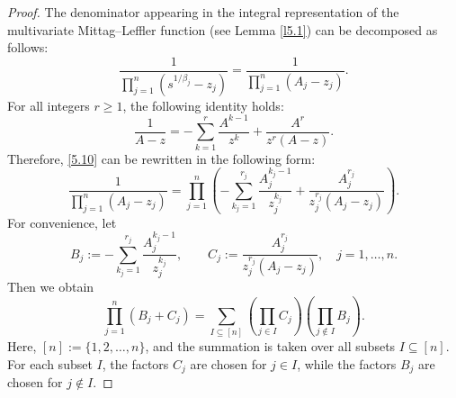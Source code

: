 \documentclass[12pt, reqno]{amsart}
\theoremstyle{definition}
\theoremstyle{remark}
\numberwithin{equation}{section}
\begin{document}
\begin{proof}
The denominator appearing in the integral representation of the multivariate Mittag--Leffler function (see Lemma \ref{l5.1}) can be decomposed as follows:
\begin{equation}\label{5.10}
\frac{
1}
{
\prod\limits_{j=1}^n(s^{1/\beta_j}-z_j)
}=\frac{
1}
{
\prod\limits_{j=1}^n(A_j-z_j)
}.
\end{equation}
For all integers $r\geq 1$, the following identity holds:
\begin{equation}\label{5.11}
\frac{1}{A-z}=-\sum_{k=1}^r\frac{A^{k-1}}{z^k}+\frac{A^r}{z^r(A-z)}.
\end{equation}
Therefore, \eqref{5.10} can be rewritten in the following form:
\begin{equation}\label{5.12}
\frac{
1}
{
\prod\limits_{j=1}^n(A_j-z_j)
}=\prod_{j=1}^n\left(-\sum_{k_j=1}^{r_j}\frac{A_j^{k_j-1}}{z_j^{k_j}}+\frac{A_j^{r_j}}{z_j^{r_j}(A_j-z_j)}\right).
\end{equation}
For convenience, let
\[
B_j:=
-\sum_{k_j=1}^{r_j}
\frac{A_j^{k_j-1}}{z_j^{k_j}},
\qquad
C_j:=
\frac{A_j^{r_j}}
{z_j^{r_j}(A_j-z_j)},
\quad j=1,\ldots,n.
\]
Then we obtain
\begin{equation}\label{5.13}
\prod_{j=1}^{n}(B_j+C_j)
=
\sum_{I\subseteq[n]}
\left(
\prod_{j\in I}C_j
\right)
\left(
\prod_{j\notin I}B_j
\right).
\end{equation}
Here, $[n]:=\{1,2,\ldots,n\}$, and the summation is taken over all subsets
$I\subseteq[n]$. For each subset $I$, the factors $C_j$ are chosen for
$j\in I$, while the factors $B_j$ are chosen for $j\notin I$.


\end{proof}
\end{document}
